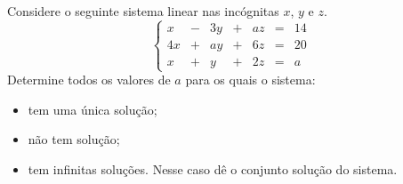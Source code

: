 \begin{problem} 
    Considere o seguinte sistema linear nas incógnitas $x$, $y$ e $z$.
$$\left\{\begin{array}{rrrrrrr}
 x & - & 3y & + &  az & = &  14\\
4x & + & ay & + &  6z & = &  20\\
 x & + &  y & + &  2z & = &   a
\end{array} \right.$$
\noindent Determine todos os valores de $a$ para os quais o sistema:
\begin{itemize}
\item[(a)] tem uma única solução;
\item[(b)] não tem solução;
\item[(c)] tem infinitas soluções. Nesse caso dê o conjunto solução do sistema.
\end{itemize}
\end{problem}
